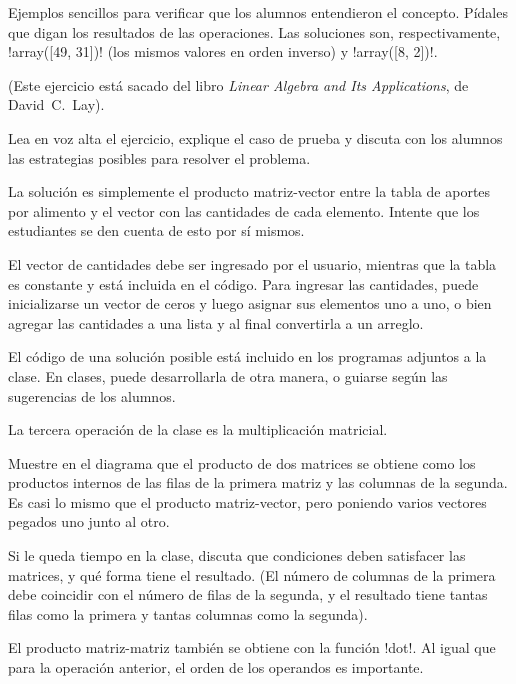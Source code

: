 \documentclass[10pt]{article}
\begin{document}

  Ejemplos sencillos
  para verificar que los alumnos entendieron el concepto.
  Pídales que digan los resultados de las operaciones.
  Las soluciones son, respectivamente,
  \li!array([49, 31])! (los mismos valores en orden inverso)
  y \li!array([8, 2])!.


  (Este ejercicio está sacado del libro \emph{Linear Algebra and Its Applications}, de David~C.~Lay).

  Lea en voz alta el ejercicio, explique el caso de prueba
  y discuta con los alumnos las estrategias posibles
  para resolver el problema.

  La solución es simplemente el producto matriz-vector
  entre la tabla de aportes por alimento
  y el vector con las cantidades de cada elemento.
  Intente que los estudiantes se den cuenta de esto por sí mismos.

  El vector de cantidades debe ser ingresado por el usuario,
  mientras que la tabla es constante y está incluida en el código.
  Para ingresar las cantidades,
  puede inicializarse un vector de ceros
  y luego asignar sus elementos uno a uno,
  o bien agregar las cantidades a una lista
  y al final convertirla a un arreglo.

  El código de una solución posible
  está incluido en los programas adjuntos a la clase.
  En clases, puede desarrollarla de otra manera,
  o guiarse según las sugerencias de los alumnos.


  La tercera operación de la clase
  es la multiplicación matricial.

  Muestre en el diagrama
  que el producto de dos matrices
  se obtiene como los productos internos
  de las filas de la primera matriz
  y las columnas de la segunda.
  Es casi lo mismo que el producto matriz-vector,
  pero poniendo varios vectores pegados uno junto al otro.

  Si le queda tiempo en la clase,
  discuta que condiciones deben satisfacer las matrices,
  y qué forma tiene el resultado.
  (El número de columnas de la primera debe coincidir
  con el número de filas de la segunda,
  y el resultado tiene tantas filas como la primera
  y tantas columnas como la segunda).


  El producto matriz-matriz también se obtiene con la función \li!dot!.
  Al igual que para la operación anterior,
  el orden de los operandos es importante.
\end{document}
